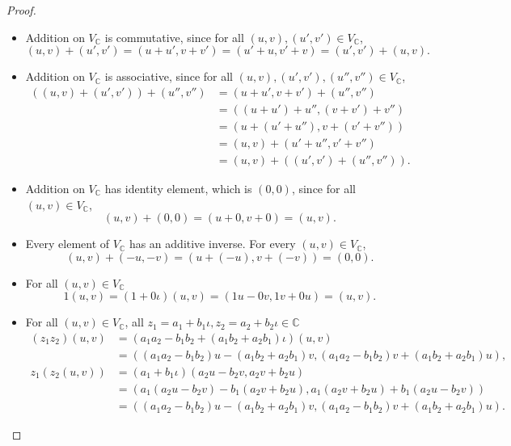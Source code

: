\begin{proof}
    \begin{itemize}
        \item Addition on $V_{\mathbb{C}}$ is commutative, since for all $(u, v), (u', v')\in V_{\mathbb{C}}$,
              \[
                  (u, v) + (u', v') = (u + u', v + v') = (u' + u, v' + v) = (u', v') + (u, v).
              \]
        \item Addition on $V_{\mathbb{C}}$ is associative, since for all $(u, v), (u', v'), (u'', v'')\in V_{\mathbb{C}}$,
              \begin{align*}
                  ((u, v) + (u', v')) + (u'', v'') & = (u + u', v + v') + (u'', v'')     \\
                                                   & = ((u + u') + u'', (v + v') + v'')  \\
                                                   & = (u + (u' + u''), v + (v' + v''))  \\
                                                   & = (u, v) + (u' + u'', v' + v'')     \\
                                                   & = (u, v) + ((u', v') + (u'', v'')).
              \end{align*}
        \item Addition on $V_{\mathbb{C}}$ has identity element, which is $(0, 0)$, since for all $(u, v)\in V_{\mathbb{C}}$,
              \[
                  (u, v) + (0, 0) = (u + 0, v + 0) = (u, v).
              \]
        \item Every element of $V_{\mathbb{C}}$ has an additive inverse. For every $(u, v)\in V_{\mathbb{C}}$,
              \[
                  (u, v) + (-u, -v) = (u + (-u), v + (-v)) = (0, 0).
              \]
        \item For all $(u, v)\in V_{\mathbb{C}}$
              \[
                  1(u, v) = (1 + 0\iota) (u, v) = (1u - 0v, 1v + 0u) = (u, v).
              \]
        \item For all $(u, v)\in V_{\mathbb{C}}$, all $z_{1} = a_{1} + b_{1}\iota, z_{2} = a_{2} + b_{2}\iota\in \mathbb{C}$
              \begin{align*}
                  (z_{1}z_{2})(u, v) & = (a_{1}a_{2} - b_{1}b_{2} + (a_{1}b_{2} + a_{2}b_{1})\iota)(u, v)                                                    \\
                                     & = ((a_{1}a_{2} - b_{1}b_{2})u - (a_{1}b_{2} + a_{2}b_{1})v, (a_{1}a_{2} - b_{1}b_{2})v + (a_{1}b_{2} + a_{2}b_{1})u), \\
                  z_{1}(z_{2}(u, v)) & = (a_{1} + b_{1}\iota)(a_{2}u - b_{2}v, a_{2}v + b_{2}u)                                                              \\
                                     & = (a_{1}(a_{2}u - b_{2}v) - b_{1}(a_{2}v + b_{2}u), a_{1}(a_{2}v + b_{2}u) + b_{1}(a_{2}u - b_{2}v))                  \\
                                     & = ((a_{1}a_{2} - b_{1}b_{2})u - (a_{1}b_{2} + a_{2}b_{1})v, (a_{1}a_{2} - b_{1}b_{2})v + (a_{1}b_{2} + a_{2}b_{1})u).
              \end{align*}


\end{itemize}
\end{proof}
